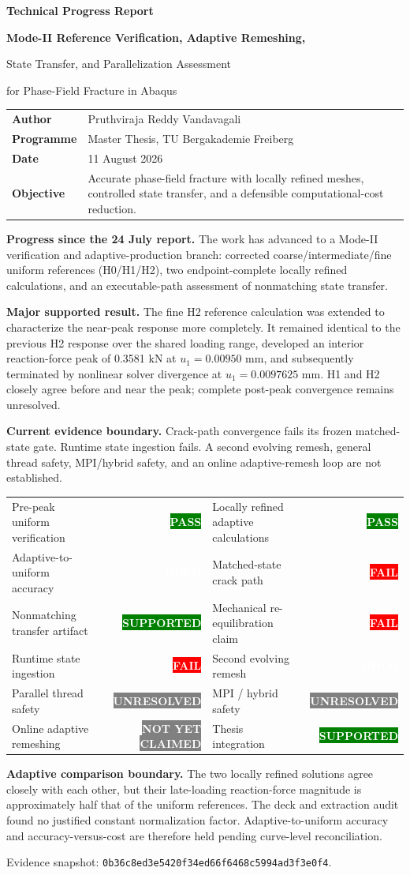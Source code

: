 \documentclass[11pt,a4paper]{article}
\newcommand{\boxx}[2]{\colorbox{#1}{\parbox{\dimexpr\linewidth-2\fboxsep}{#2}}}
\newcommand{\headx}[1]{{\color{navy}\fontsize{17}{20}\selectfont\bfseries #1}\par\vspace{1.5mm}{\color{blue}\rule{\linewidth}{1.1pt}}\vspace{3mm}}
\newcommand{\status}[2]{\colorbox{#1}{\textcolor{white}{\bfseries\fontsize{8.5}{10}\selectfont #2}}}
\newcommand{\tablefont}{\fontsize{9.5}{11.5}\selectfont}
\newcommand{\captionfont}{\fontsize{9.5}{11.5}\selectfont}
\newcommand{\pass}{\status{green}{PASS}}\newcommand{\supported}{\status{green}{SUPPORTED}}
\newcommand{\hold}{\status{amber}{HOLD}}\newcommand{\fail}{\status{red}{FAIL}}
\newcommand{\unresolved}{\status{gray}{UNRESOLVED}}\newcommand{\notclaimed}{\status{gray}{NOT YET CLAIMED}}
\begin{document}
\headx{Technical Progress Report}
{\fontsize{17}{20}\selectfont\bfseries Mode-II Reference Verification, Adaptive Remeshing,\par State Transfer, and Parallelization Assessment\par for Phase-Field Fracture in Abaqus\par}
\begin{tabularx}{\linewidth}{@{}lX@{}}
\textbf{Author} & Pruthviraja Reddy Vandavagali\\
\textbf{Programme} & Master Thesis, TU Bergakademie Freiberg\\
\textbf{Date} & 11 August 2026\\
\textbf{Objective} & Accurate phase-field fracture with locally refined meshes, controlled state transfer, and a defensible computational-cost reduction.\\
\end{tabularx}
\boxx{pb}{\textbf{Progress since the 24 July report.} The work has advanced to a Mode-II verification and adaptive-production branch: corrected coarse/intermediate/fine uniform references (H0/H1/H2), two endpoint-complete locally refined calculations, and an executable-path assessment of nonmatching state transfer.}
\boxx{pg}{\textbf{Major supported result.} The fine H2 reference calculation was extended to characterize the near-peak response more completely. It remained identical to the previous H2 response over the shared loading range, developed an interior reaction-force peak of 0.3581 kN at $u_1=0.00950$ mm, and subsequently terminated by nonlinear solver divergence at $u_1=0.0097625$ mm. H1 and H2 closely agree before and near the peak; complete post-peak convergence remains unresolved.}
\boxx{pr}{\textbf{Current evidence boundary.} Crack-path convergence fails its frozen matched-state gate. Runtime state ingestion fails. A second evolving remesh, general thread safety, MPI/hybrid safety, and an online adaptive-remesh loop are not established.}
\tablefont
\begin{tabularx}{\linewidth}{@{}XrXr@{}}\toprule
Pre-peak uniform verification&\pass&Locally refined adaptive calculations&\pass\\
Adaptive-to-uniform accuracy&\hold&Matched-state crack path&\fail\\
Nonmatching transfer artifact&\supported&Mechanical re-equilibration claim&\fail\\
Runtime state ingestion&\fail&Second evolving remesh&\hold\\
Parallel thread safety&\unresolved&MPI / hybrid safety&\unresolved\\
Online adaptive remeshing&\notclaimed&Thesis integration&\supported\\\bottomrule
\end{tabularx}
\boxx{pa}{\textbf{Adaptive comparison boundary.} The two locally refined solutions agree closely with each other, but their late-loading reaction-force magnitude is approximately half that of the uniform references. The deck and extraction audit found no justified constant normalization factor. Adaptive-to-uniform accuracy and accuracy-versus-cost are therefore held pending curve-level reconciliation.}
\vfill\captionfont Evidence snapshot: \texttt{0b36c8ed3e5420f34ed66f6468c5994ad3f3e0f4}.
\end{document}
